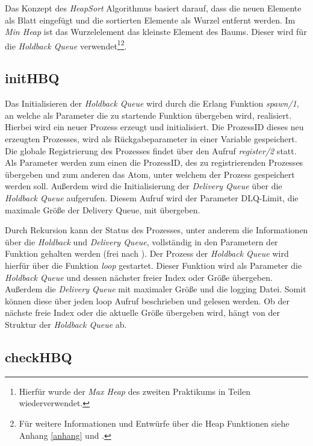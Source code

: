 Das Konzept des \textit{HeapSort} Algorithmus basiert darauf, dass die neuen Elemente als Blatt eingefügt und die sortierten Elemente als Wurzel entfernt werden. Im \textit{Min Heap} ist das Wurzelelement das kleinste Element des Baums. Dieser wird für die \textit{Holdback Queue} verwendet\footnote{Hierfür wurde der \textit{Max Heap} des zweiten Praktikums in Teilen wiederverwendet.}\footnote{Für weitere Informationen und Entwürfe über die Heap Funktionen siehe Anhang \ref{anhang} und \cite{sortAlgo}.}.

\subsection{initHBQ}

Das Initialisieren der \textit{Holdback Queue} wird durch die Erlang Funktion \textit{spawn/1}, an welche als Parameter die zu startende Funktion übergeben wird, realisiert. Hierbei wird ein neuer Prozess erzeugt und initialisiert. Die ProzessID dieses neu erzeugten Prozesses, wird als Rückgabeparameter in einer Variable gespeichert. 
Die globale Registrierung des Prozesses findet über den Aufruf \textit{register/2} statt. Als Parameter werden zum einen die ProzessID, des zu registrierenden Prozesses übergeben und zum anderen das Atom, unter welchem der Prozess gespeichert werden soll. 
Außerdem wird die Initialisierung der \textit{Delivery Queue} über die \textit{Holdback Queue} aufgerufen. Diesem Aufruf wird der Parameter DLQ-Limit, die maximale Größe der Delivery Queue, mit übergeben. 

Durch Rekursion kann der Status des Prozesses, unter anderem die Informationen über die \textit{Holdback} und \textit{Delivery Queue}, vollständig in den Parametern der Funktion gehalten werden (frei nach \cite{learnErlang}). Der Prozess der \textit{Holdback Queue} wird hierfür über die Funktion \textit{loop} gestartet. Dieser Funktion wird als Parameter die \textit{Holdback Queue} und dessen nächster freier Index oder Größe übergeben. Außerdem die \textit{Delivery Queue} mit maximaler Größe und die logging Datei. Somit können diese über jeden loop Aufruf beschrieben und gelesen werden. 
Ob der nächste freie Index oder die aktuelle Größe übergeben wird, hängt von der Struktur der \textit{Holdback Queue} ab. 

\subsection{checkHBQ} \label{checkHBQ}

